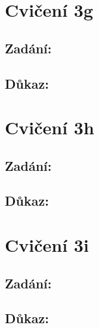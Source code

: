 \documentclass{article}
\begin{document}
\section{Cvičení 3g}

\subsection{Zadání:}

\subsection{Důkaz:}

\section{Cvičení 3h}

\subsection{Zadání:}

\subsection{Důkaz:}

\section{Cvičení 3i}

\subsection{Zadání:}

\subsection{Důkaz:}
\end{document}
